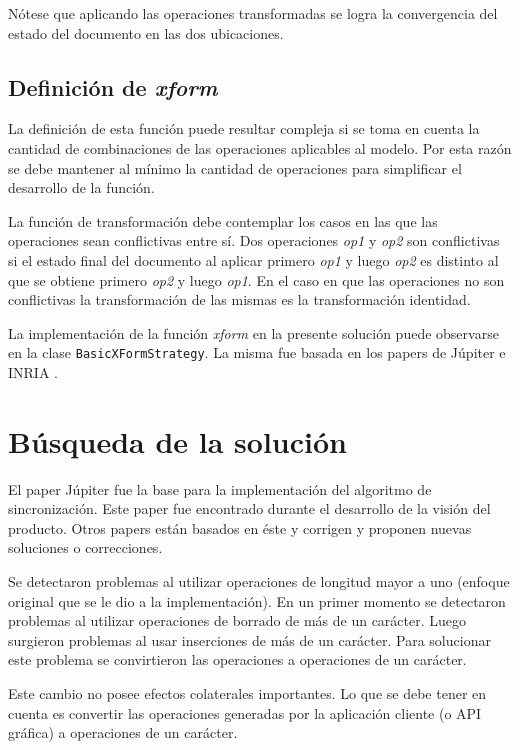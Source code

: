 \documentclass[12pt,a4paper]{article}
\let\stdsection\section
\renewcommand\section{\newpage\stdsection}
\begin{document}
Nótese que aplicando las operaciones transformadas se logra la convergencia del estado del documento 
en las dos ubicaciones.

\subsection{Definición de \textit{xform}}

La definición de esta función puede resultar compleja si se toma en cuenta la cantidad de 
combinaciones de las operaciones aplicables al modelo. Por esta razón se debe mantener al mínimo la 
cantidad de operaciones para simplificar el desarrollo de la función.

La función de transformación debe contemplar los casos en las que las operaciones sean conflictivas entre 
sí. Dos operaciones \textit{op1} y \textit{op2} son conflictivas si el estado final del documento al aplicar 
primero \textit{op1} y luego \textit{op2} es distinto al que se obtiene primero \textit{op2} y luego \textit{op1}.
En el caso en que las operaciones no son conflictivas la transformación de las mismas es la transformación 
identidad.

La implementación de la función \textit{xform} en la presente solución puede observarse en la clase 
\texttt{BasicXFormStrategy}. La misma fue basada en los papers de Júpiter e INRIA \cite{inria}.

	\section{Búsqueda de la solución}

El paper Júpiter \cite{jupiter} fue la base para la implementación del algoritmo de sincronización. Este paper fue 
encontrado durante el desarrollo de la visión \cite{visiontpprof} del producto. Otros papers están basados en éste y
corrigen y proponen nuevas soluciones o correcciones.

Se detectaron problemas al utilizar operaciones de longitud mayor a uno (enfoque original que se le
dio a la implementación). En un primer momento se detectaron problemas al utilizar operaciones de borrado
de más de un carácter. Luego surgieron problemas al usar inserciones de más de un carácter. Para solucionar
este problema se convirtieron las operaciones a operaciones de un carácter.

Este cambio no posee efectos colaterales importantes. Lo que se debe tener en cuenta es convertir las
operaciones generadas por la aplicación cliente (o API gráfica) a operaciones de un carácter.
\end{document}
